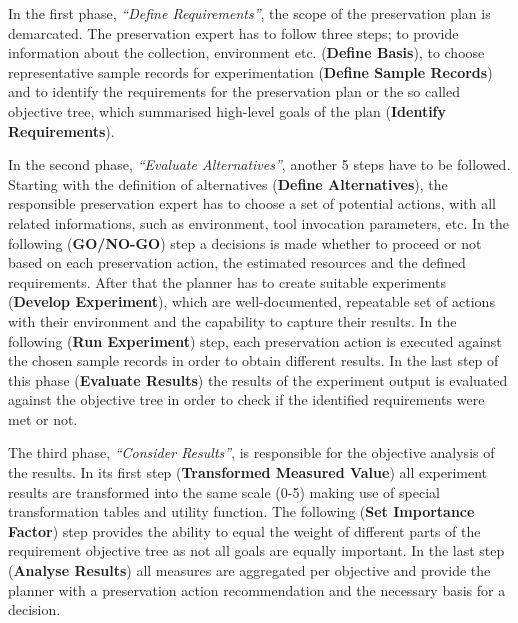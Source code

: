 In the first phase, \textit{``Define Requirements''}, the scope of the preservation plan is demarcated. The preservation expert has to follow three steps; to provide information about the collection, environment etc. (\textbf{Define Basis}), to choose representative sample records for experimentation (\textbf{Define Sample Records}) and to identify the requirements for the preservation plan or the so called objective tree, which summarised high-level goals of the plan (\textbf{Identify Requirements}). 

In the second phase, \textit{``Evaluate Alternatives''}, another 5 steps have to be followed. Starting with the definition of alternatives (\textbf{Define Alternatives}), the responsible preservation expert has to choose a set of potential actions, with all related informations, such as environment, tool invocation parameters, etc. In the following (\textbf{GO/NO-GO}) step a decisions is made whether to proceed or not based on each preservation action, the estimated resources and the defined requirements. After that the planner has to create suitable experiments (\textbf{Develop Experiment}), which are well-documented, repeatable set of actions with their environment and the capability to capture their results. In the following (\textbf{Run Experiment}) step, each preservation action is executed against the chosen sample records in order to obtain different results. In the last step of this phase (\textbf{Evaluate Results}) the results of the experiment output is evaluated against the objective tree in order to check if the identified requirements were met or not.

The third phase, \textit{``Consider Results''}, is responsible for the objective analysis of the results. In its first step (\textbf{Transformed Measured Value}) all experiment results are transformed into the same scale (0-5) making use of special transformation tables and utility function. The following (\textbf{Set Importance Factor}) step provides the ability to equal the weight of different parts of the requirement objective tree as not all goals are equally important. In the last step (\textbf{Analyse Results}) all measures are aggregated per objective and provide the planner with a preservation action recommendation and the necessary basis for a decision.

